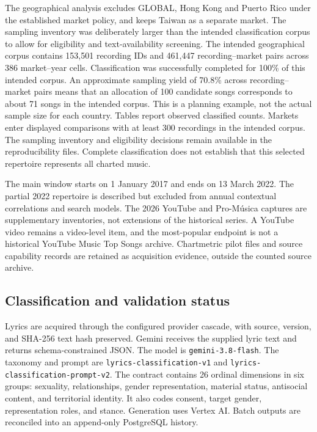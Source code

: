 \documentclass[10pt,a4paper,twocolumn]{article}
\begin{document}
The geographical analysis excludes GLOBAL, Hong Kong and Puerto Rico under the established market policy, and keeps Taiwan as a separate market. The sampling inventory was deliberately larger than the intended classification corpus to allow for eligibility and text-availability screening. The intended geographical corpus contains 153,501 recording IDs and 461,447 recording--market pairs across 386 market--year cells. Classification was successfully completed for 100\% of this intended corpus. An approximate sampling yield of 70.8\% across recording--market pairs means that an allocation of 100 candidate songs corresponds to about 71 songs in the intended corpus. This is a planning example, not the actual sample size for each country. Tables report observed classified counts. Markets enter displayed comparisons with at least 300 recordings in the intended corpus. The sampling inventory and eligibility decisions remain available in the reproducibility files. Complete classification does not establish that this selected repertoire represents all charted music.

The main window starts on 1 January 2017 and ends on 13 March 2022. The partial 2022 repertoire is described but excluded from annual contextual correlations and search models. The 2026 YouTube and Pro-M\'usica captures are supplementary inventories, not extensions of the historical series. A YouTube video remains a video-level item, and the most-popular endpoint is not a historical YouTube Music Top Songs archive. Chartmetric pilot files and source capability records are retained as acquisition evidence, outside the counted source archive.

\subsection{Classification and validation status}
Lyrics are acquired through the configured provider cascade, with source, version, and SHA-256 text hash preserved. Gemini receives the supplied lyric text and returns schema-constrained JSON. The model is \texttt{gemini-3.8-flash}. The taxonomy and prompt are \texttt{lyrics-classification-v1} and \texttt{lyrics-classification-prompt-v2}. The contract contains 26 ordinal dimensions in six groups: sexuality, relationships, gender representation, material status, antisocial content, and territorial identity. It also codes consent, target gender, representation roles, and stance. Generation uses Vertex AI. Batch outputs are reconciled into an append-only PostgreSQL history.
\end{document}
